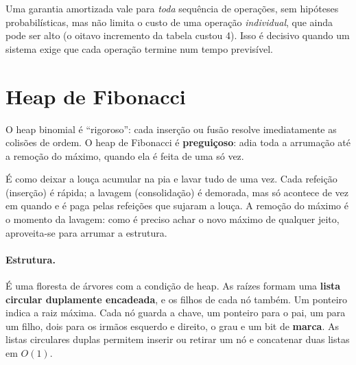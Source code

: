 \begin{cuidado}
Uma garantia amortizada vale para \emph{toda} sequência de operações, sem hipóteses probabilísticas, mas não limita o custo de uma operação \emph{individual}, que ainda pode ser alto (o oitavo incremento da tabela custou 4). Isso é decisivo quando um sistema exige que cada operação termine num tempo previsível.
\end{cuidado}

\section{Heap de Fibonacci}\label{sec:fib}
O heap binomial é ``rigoroso'': cada inserção ou fusão resolve imediatamente as colisões de ordem. O heap de Fibonacci é \textbf{preguiçoso}: adia toda a arrumação até a remoção do máximo, quando ela é feita de uma só vez.

\begin{intuicao}
É como deixar a louça acumular na pia e lavar tudo de uma vez. Cada refeição (inserção) é rápida; a lavagem (consolidação) é demorada, mas só acontece de vez em quando e é paga pelas refeições que sujaram a louça. A remoção do máximo é o momento da lavagem: como é preciso achar o novo máximo de qualquer jeito, aproveita-se para arrumar a estrutura.
\end{intuicao}

\paragraph{Estrutura.} É uma floresta de árvores com a condição de heap. As raízes formam uma \textbf{lista circular duplamente encadeada}, e os filhos de cada nó também. Um ponteiro indica a raiz máxima. Cada nó guarda a chave, um ponteiro para o pai, um para um filho, dois para os irmãos esquerdo e direito, o grau e um bit de \textbf{marca}. As listas circulares duplas permitem inserir ou retirar um nó e concatenar duas listas em $O(1)$.

